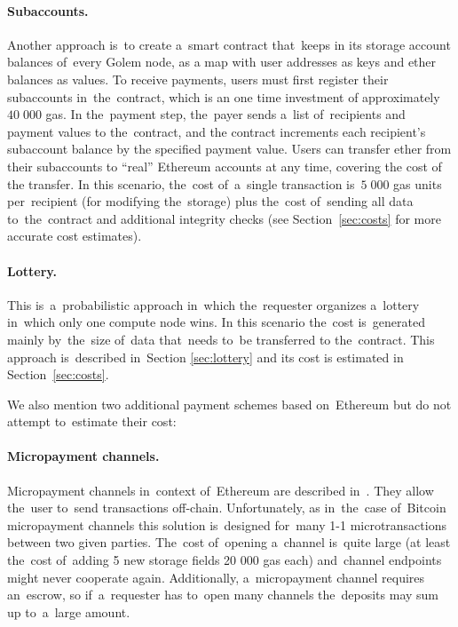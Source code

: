 \documentclass[a4paper]{article}
\begin{document}
    \paragraph{Subaccounts.}
    Another approach is~to create a~smart contract that~keeps in its storage account balances of~every Golem node,
    as a map with user addresses as keys and ether balances as values. 
    To receive payments, users must first register their subaccounts in~the~contract, which is an one time investment
    of approximately $40\;000$ gas.
    In the~payment step, the~payer sends a~list of~recipients and payment values to the~contract, and
    the contract increments each recipient's subaccount balance by the specified payment value. 
    Users can transfer ether from their subaccounts to ``real'' Ethereum accounts at any time, covering the cost of the transfer.
    In this scenario, the~cost of~a~single transaction is~$5\;000$ gas units per~recipient (for modifying the~storage)
    plus the~cost of~sending all data to~the~contract and additional integrity checks (see Section~\ref{sec:costs} for
    more accurate cost estimates).

    \paragraph{Lottery.} 
    This is~a~probabilistic approach in~which the~requester organizes a~lottery in~which only one compute node
    wins. In this scenario the~cost is~generated mainly by~the~size of~data that~needs to~be transferred to
    the~contract. This approach is~described in~Section \ref{sec:lottery} and its cost is estimated in Section~\ref{sec:costs}.

    We also mention two additional payment schemes based on~Ethereum but do not attempt to~estimate their cost:
    
    \paragraph{Micropayment channels.}
    Micropayment channels in~context of~Ethereum are described in~\cite{BUTERIN}. They allow the~user to~send
    transactions off-chain. Unfortunately, as in~the~case of~Bitcoin micropayment channels \cite{BITCOINJ} this
    solution is~designed for~many 1-1 microtransactions between two given parties. The~cost of~opening a~channel
    is~quite large (at least the~cost of~adding 5 new storage fields 20 000 gas each) and~channel endpoints might
    never cooperate again. Additionally, a~micropayment channel requires an~escrow, so if~a~requester has to~open
    many channels the~deposits may sum up to~a~large amount.
\end{document}
